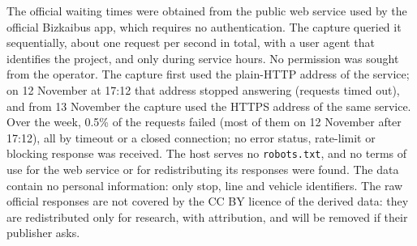 
The official waiting times were obtained from the public web service used by the official Bizkaibus app, which requires
no authentication. The capture queried it sequentially, about one request per second in total, with a user agent that
identifies the project, and only during service hours. No permission was sought from the operator. The capture first used the plain-HTTP address of the service; on 12
November at 17:12 that address stopped answering (requests timed out), and from 13 November the capture used the HTTPS
address of the same service. Over the week, 0.5\% of the requests failed (most of them on 12 November after 17:12), all by timeout or a closed
connection; no
error status, rate-limit or blocking response was received. The host serves no \texttt{robots.txt}, and no terms of use
for the web service or for redistributing its responses were found. The data contain no
personal information: only stop, line and vehicle identifiers. The raw official responses are not covered by the CC BY licence of the derived data: they are redistributed only for
research, with attribution, and will be removed if their publisher asks.
